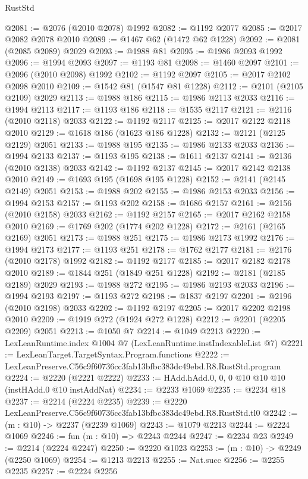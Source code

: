 \begin{lexlean}{RustStd}
\begin{coremodule}
@2081 := @2076 (@2010 @2078) @1992
@2082 := @1192 @2077
@2085 := @2017 @2082 @2078 @2010
@2089 := @1467 @62 (@1472 @62 @1228)
@2092 := @2081 (@2085 @2089) @2029
@2093 := @1988 @81
@2095 := @1986 @2093 @1992
@2096 := @1994 @2093
@2097 := @1193 @81
@2098 := @1460 @2097
@2101 := @2096 (@2010 @2098) @1992
@2102 := @1192 @2097
@2105 := @2017 @2102 @2098 @2010
@2109 := @1542 @81 (@1547 @81 @1228)
@2112 := @2101 (@2105 @2109) @2029
@2113 := @1988 @186
@2115 := @1986 @2113 @2033
@2116 := @1994 @2113
@2117 := @1193 @186
@2118 := @1535 @2117
@2121 := @2116 (@2010 @2118) @2033
@2122 := @1192 @2117
@2125 := @2017 @2122 @2118 @2010
@2129 := @1618 @186 (@1623 @186 @1228)
@2132 := @2121 (@2125 @2129) @2051
@2133 := @1988 @195
@2135 := @1986 @2133 @2033
@2136 := @1994 @2133
@2137 := @1193 @195
@2138 := @1611 @2137
@2141 := @2136 (@2010 @2138) @2033
@2142 := @1192 @2137
@2145 := @2017 @2142 @2138 @2010
@2149 := @1693 @195 (@1698 @195 @1228)
@2152 := @2141 (@2145 @2149) @2051
@2153 := @1988 @202
@2155 := @1986 @2153 @2033
@2156 := @1994 @2153
@2157 := @1193 @202
@2158 := @1686 @2157
@2161 := @2156 (@2010 @2158) @2033
@2162 := @1192 @2157
@2165 := @2017 @2162 @2158 @2010
@2169 := @1769 @202 (@1774 @202 @1228)
@2172 := @2161 (@2165 @2169) @2051
@2173 := @1988 @251
@2175 := @1986 @2173 @1992
@2176 := @1994 @2173
@2177 := @1193 @251
@2178 := @1762 @2177
@2181 := @2176 (@2010 @2178) @1992
@2182 := @1192 @2177
@2185 := @2017 @2182 @2178 @2010
@2189 := @1844 @251 (@1849 @251 @1228)
@2192 := @2181 (@2185 @2189) @2029
@2193 := @1988 @272
@2195 := @1986 @2193 @2033
@2196 := @1994 @2193
@2197 := @1193 @272
@2198 := @1837 @2197
@2201 := @2196 (@2010 @2198) @2033
@2202 := @1192 @2197
@2205 := @2017 @2202 @2198 @2010
@2209 := @1919 @272 (@1924 @272 @1228)
@2212 := @2201 (@2205 @2209) @2051
@2213 := @1050 @7
@2214 := @1049 @2213
@2220 := LexLeanRuntime.index @1004 @7 (LexLeanRuntime.instIndexableList @7)
@2221 := LexLeanTarget.TargetSyntax.Program.functions
@2222 := LexLeanPreserve.C56c9f60736cc3fab13bfbc383dc49ebd.R8.RustStd.program
@2224 := @2220 (@2221 @2222)
@2233 := HAdd.hAdd.{0, 0, 0} @10 @10 @10 (instHAdd.{0} @10 instAddNat)
@2234 := @2233 @1069
@2235 := @2234 @18
@2237 := @2214 (@2224 @2235)
@2239 := @2220 LexLeanPreserve.C56c9f60736cc3fab13bfbc383dc49ebd.R8.RustStd.tl0
@2242 := (m : @10) -> @2237 (@2239 @1069)
@2243 := @1079 @2213
@2244 := @2224 @1069
@2246 := fun (m : @10) => @2243 @2244
@2247 := @2234 @23
@2249 := @2214 (@2224 @2247)
@2250 := @2220 @1023
@2253 := (m : @10) -> @2249 (@2250 @1069)
@2254 := @1213 @2213
@2255 := Nat.succ
@2256 := @2255 @2235
@2257 := @2224 @2256

\end{coremodule}
\end{lexlean}
